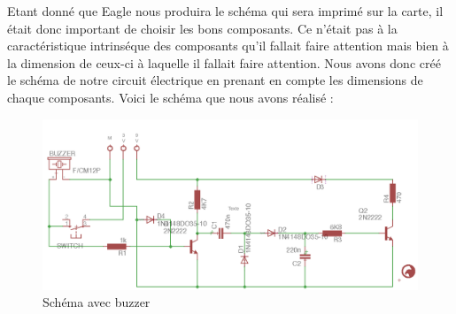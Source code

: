 Etant donné que Eagle nous produira le schéma qui sera imprimé sur la carte, il était donc important de choisir les bons composants. Ce n'était pas à la caractéristique intrinséque des composants qu'il fallait faire attention mais bien à la dimension de ceux-ci à laquelle il fallait faire attention. Nous avons donc créé le schéma de notre circuit électrique en prenant en compte les dimensions de chaque composants. Voici le schéma que nous avons réalisé : 


\begin{figure}[H]
\centering
\includegraphics[width=1\textwidth]{ressources/schema_final}
\caption{Schéma avec buzzer}
\end{figure}







